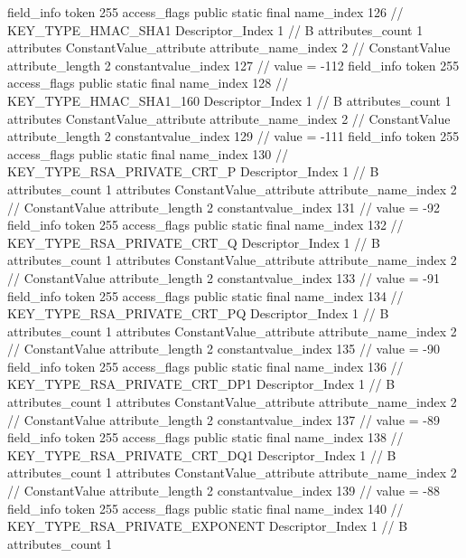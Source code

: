 {{{{{{{				}
				}
			}
			field_info {
				token	255
				access_flags	public static final
				name_index	126		// KEY_TYPE_HMAC_SHA1
				Descriptor_Index	1		// B
				attributes_count	1
				attributes {
				ConstantValue_attribute {
					attribute_name_index	2		// ConstantValue
					attribute_length	2
					constantvalue_index	127		// value = -112
				}
				}
			}
			field_info {
				token	255
				access_flags	public static final
				name_index	128		// KEY_TYPE_HMAC_SHA1_160
				Descriptor_Index	1		// B
				attributes_count	1
				attributes {
				ConstantValue_attribute {
					attribute_name_index	2		// ConstantValue
					attribute_length	2
					constantvalue_index	129		// value = -111
				}
				}
			}
			field_info {
				token	255
				access_flags	public static final
				name_index	130		// KEY_TYPE_RSA_PRIVATE_CRT_P
				Descriptor_Index	1		// B
				attributes_count	1
				attributes {
				ConstantValue_attribute {
					attribute_name_index	2		// ConstantValue
					attribute_length	2
					constantvalue_index	131		// value = -92
				}
				}
			}
			field_info {
				token	255
				access_flags	public static final
				name_index	132		// KEY_TYPE_RSA_PRIVATE_CRT_Q
				Descriptor_Index	1		// B
				attributes_count	1
				attributes {
				ConstantValue_attribute {
					attribute_name_index	2		// ConstantValue
					attribute_length	2
					constantvalue_index	133		// value = -91
				}
				}
			}
			field_info {
				token	255
				access_flags	public static final
				name_index	134		// KEY_TYPE_RSA_PRIVATE_CRT_PQ
				Descriptor_Index	1		// B
				attributes_count	1
				attributes {
				ConstantValue_attribute {
					attribute_name_index	2		// ConstantValue
					attribute_length	2
					constantvalue_index	135		// value = -90
				}
				}
			}
			field_info {
				token	255
				access_flags	public static final
				name_index	136		// KEY_TYPE_RSA_PRIVATE_CRT_DP1
				Descriptor_Index	1		// B
				attributes_count	1
				attributes {
				ConstantValue_attribute {
					attribute_name_index	2		// ConstantValue
					attribute_length	2
					constantvalue_index	137		// value = -89
				}
				}
			}
			field_info {
				token	255
				access_flags	public static final
				name_index	138		// KEY_TYPE_RSA_PRIVATE_CRT_DQ1
				Descriptor_Index	1		// B
				attributes_count	1
				attributes {
				ConstantValue_attribute {
					attribute_name_index	2		// ConstantValue
					attribute_length	2
					constantvalue_index	139		// value = -88
				}
				}
			}
			field_info {
				token	255
				access_flags	public static final
				name_index	140		// KEY_TYPE_RSA_PRIVATE_EXPONENT
				Descriptor_Index	1		// B
				attributes_count	1
}}}}}
